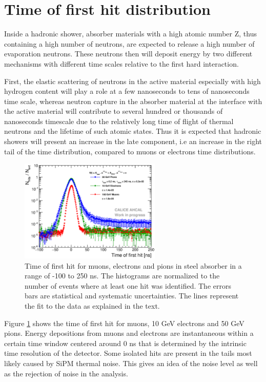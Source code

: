 \section{Time of first hit distribution}

Inside a hadronic shower, absorber materials with a high atomic number Z, thus containing a high number of neutrons, are expected to release a high number of evaporation neutrons. These neutrons then will deposit energy by two different mechanisms with different time scales relative to the first hard interaction.

First, the elastic scattering of neutrons in the active material especially with high hydrogen content will play a role at a few nanoseconds to tens of nanoseconds time scale, whereas neutron capture in the absorber material at the interface with the active material will contribute to several hundred or thousands of nanoseconds timescale due to the relatively long time of flight of thermal neutrons and the lifetime of such atomic states. Thus it is expected that hadronic showers will present an increase in the late component, i.e an increase in the right tail of the time distribution, compared to muons or electrons time distributions.

\begin{figure}[htbp!]
	\centering
	\includegraphics[width=0.6\textwidth]{../Thesis_Plots/Timing/Pions/Plots/Timing_dNdt_Comparison.eps}
	\caption{Time of first hit for muons, electrons and pions in steel absorber in a range of -100 to 250 ns. The histograms are normalized to the number of events where at least one hit was identified. The errors bars are statistical and systematic uncertainties. The lines represent the fit to the data as explained in the text.}
	\label{fig:dNdt_Comparison}
\end{figure}

Figure \ref{fig:dNdt_Comparison} shows the time of first hit for muons, 10 GeV electrons and 50 GeV pions. Energy depositions from muons and electrons are instantaneous within a certain time window centered around 0 ns that is determined by the intrinsic time resolution of the detector. Some isolated hits are present in the tails most likely caused by SiPM thermal noise. This gives an idea of the noise level as well as the rejection of noise in the analysis.

